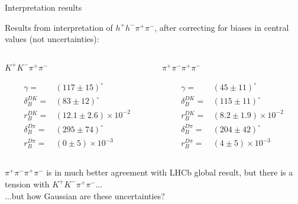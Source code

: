 \documentclass{beamer}
\begin{document}
\begin{frame}{Interpretation results}
  \begin{center}
    {\large Results from interpretation of $h^+h^-\pi^+\pi^-$, after correcting for biases in central values (not uncertainties):}
  \end{center}
  \vspace{-0.5cm}
  \begin{columns}
    \begin{column}{0.5\textwidth}
      \begin{center}
        $K^+K^-\pi^+\pi^-$
      \end{center}
      \begin{align*}
        \gamma =& (117 \pm 15)^\circ \\
        \delta_B^{DK} =& (83 \pm 12)^\circ \\
        r_B^{DK} =& (12.1 \pm 2.6)\times10^{-2} \\
        \delta_B^{D\pi} =& (295 \pm 74)^\circ \\
        r_B^{D\pi} =& (0 \pm 5)\times10^{-3}
      \end{align*}
    \end{column}
    \begin{column}{0.5\textwidth}
      \begin{center}
        $\pi^+\pi^-\pi^+\pi^-$
      \end{center}
      \begin{align*}
        \gamma =& (45 \pm 11)^\circ \\
        \delta_B^{DK} =& (115 \pm 11)^\circ \\
        r_B^{DK} =& (8.2 \pm 1.9)\times10^{-2} \\
        \delta_B^{D\pi} =& (204 \pm 42)^\circ \\
        r_B^{D\pi} =& (4 \pm 5)\times10^{-3}
      \end{align*}
    \end{column}
  \end{columns}
  \vspace{0.3cm}
  \begin{center}
    $\pi^+\pi^-\pi^+\pi^-$ is in much better agreement with LHCb global result, but there is a tension with $K^+K^-\pi^+\pi^-$...\\
    ...but how Gaussian are these uncertainties?
  \end{center}
\end{frame}
\end{document}
